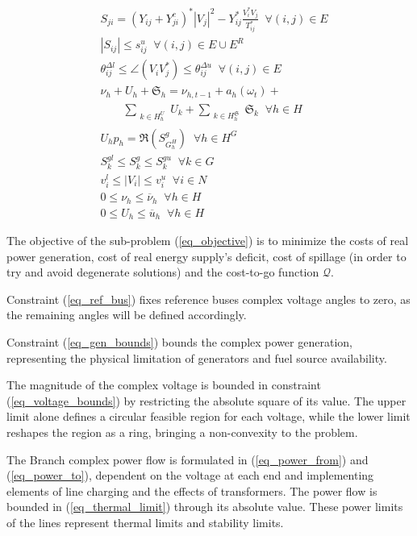 \documentclass{juliacon}
\begin{document}
\begin{subequations}
\begin{align}
& S_{ji} = \left( Y_{ij} + Y^c_{ji} \right)^* |V_j|^2 - Y^*_{ij} \frac{V^*_i V_j}{{T}^*_{ij}} \;\; \forall (i,j)\in E \label{eq_power_to}\\
& |S_{ij}| \leq s^u_{ij} \;\; \forall (i,j) \in E \cup E^R \label{eq_thermal_limit}\\
& \theta^{\Delta l}_{ij} \leq \angle (V_i V^*_j) \leq \theta^{\Delta u}_{ij} \;\; \forall (i,j) \in E \label{eq_angle_difference}  \\
& \nu_h + U_h + \mathfrak{S}_h = \nu_{h,t-1} + a_h(\omega_t) + \nonumber \\ 
& \qquad  \sum_{\substack{k \in H^U_h}} U_k + \sum_{\substack{k \in H^{\mathfrak{S}}_h}} \mathfrak{S}_k \;\; \forall h \in H \label{eq_hydro_balance} \\
& U_h p_h = \Re(S^g_{G^H_h}) \;\; \forall h \in H^G \label{eq_hydro_generation} \\
& S^{gl}_k \leq S^g_k \leq S^{gu}_k \;\; \forall k \in G  \label{eq_gen_bounds}\\
& v^l_i \leq |V_i| \leq v^u_i \;\; \forall i \in N \label{eq_voltage_bounds}\\
& 0 \leq \nu_h \leq \overline{\nu}_h \;\; \forall h \in H \label{eq_volume_limit}\\
& 0 \leq U_h \leq \overline{u}_h \;\; \forall h \in H \label{eq_outflow_limit}
%
\end{align}
\end{subequations}

The objective of the sub-problem (\ref{eq_objective}) is to minimize the costs of real power generation, cost of real energy supply's deficit, cost of spillage (in order to try and avoid degenerate solutions) and the cost-to-go function $\mathcal{Q}$.

Constraint (\ref{eq_ref_bus}) fixes reference buses complex voltage angles to zero, as the remaining angles will be defined accordingly. 

Constraint (\ref{eq_gen_bounds}) bounds the complex power generation, representing the physical limitation of generators and fuel source availability.

The magnitude of the complex voltage is bounded in constraint (\ref{eq_voltage_bounds}) by restricting the absolute square of its value. The upper limit alone defines a circular feasible region for each voltage, while the lower limit reshapes the region as a ring, bringing a non-convexity to the problem.

The Branch complex power flow is formulated in (\ref{eq_power_from}) and (\ref{eq_power_to}), dependent on the voltage at each end and implementing elements of line charging and the effects of transformers. 
The power flow is bounded in (\ref{eq_thermal_limit}) through its absolute value. These power limits of the lines represent thermal limits and stability limits.
\end{document}
